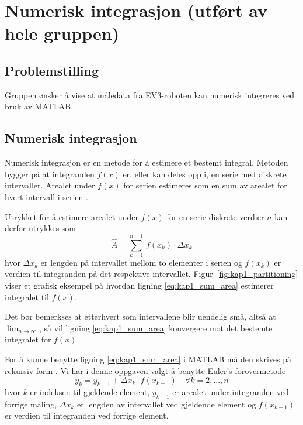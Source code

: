 \documentclass[main.tex]{subfiles}
\begin{document}
\chapter{Numerisk integrasjon (utført av hele gruppen) }\label{kap:integrasjon}

\section{Problemstilling}
Gruppen ønsker å vise at måledata fra \textsc{EV3}-roboten kan numerisk integreres ved bruk av \textsc{MATLAB}.

\section{Numerisk integrasjon}
Numerisk integrasjon er en metode for å estimere et bestemt integral. Metoden bygger på at integranden $f(x)$ er, eller kan deles opp i, en serie med diskrete intervaller. Arealet under $f(x)$ for serien estimeres som en sum av arealet for hvert intervall i serien \parencite[s. 297–301]{AdaEss2017}.

Utrykket for å estimere arealet under $f(x)$ for en serie diskrete verdier $n$ kan derfor utrykkes som
\begin{equation}\label{eq:kap1_sum_area}
    \hat{A} =\sum_{k=1}^{n-1} \, f(x_k) \cdot \Delta x_k
\end{equation}
hvor $\Delta x_k$ er lengden på intervallet mellom to elementer i serien og $f(x_k)$ er verdien til integranden på det respektive intervallet. Figur~\ref{fig:kap1_partitioning} viser et grafisk eksempel på hvordan ligning \eqref{eq:kap1_sum_area} estimerer integralet til $f(x)$.



Det bør bemerkses at etterhvert som intervallene blir uendelig små, altså at $\lim_{n \to \infty}$, så vil ligning \eqref{eq:kap1_sum_area} konvergere mot det bestemte integralet for $f(x)$.

For å kunne benytte ligning \eqref{eq:kap1_sum_area} i \textsc{MATLAB} må den skrives på rekursiv form \parencite[s.~53–58]{Dre2023Simulink}. Vi har i denne oppgaven valgt å benytte Euler's forovermetode
\begin{equation}\label{eq:kap1_area_rec}
    y_k = y_{k-1} + \Delta{x_k} \cdot f(x_{k-1}) \quad \forall k=2,..., n
\end{equation}
hvor $k$ er indeksen til gjeldende element, $y_{k-1}$ er arealet under integranden ved forrige måling, $\Delta{x_k}$ er lengden av intervallet ved gjeldende element og $f(x_{k-1})$ er verdien til integranden ved forrige element.
\end{document}
